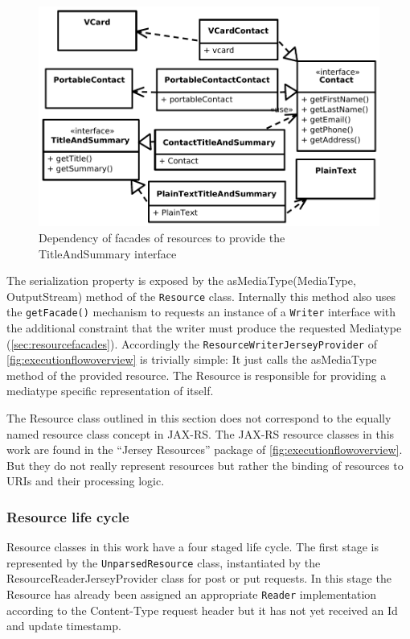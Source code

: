 \documentclass[12pt,a4paper,twoside]{scrartcl}		%
\begin{document}
\begin{figure}[htb]
  \centering
  \includegraphics[width=1\textwidth]{titleandsummary}

  \caption{Dependency of facades of resources to provide the TitleAndSummary interface}
  \label{fig:titleandsummary}
\end{figure}

The serialization property is exposed by the asMediaType(MediaType,
OutputStream) method of the \lstinline:Resource: class. Internally this method
also uses the \lstinline:getFacade(): mechanism to requests an instance of a
\lstinline:Writer: interface with the additional constraint that the writer must
produce the requested Mediatype (\autoref{sec:resourcefacades}). Accordingly the
\lstinline:ResourceWriterJerseyProvider: of \autoref{fig:executionflowoverview}
is trivially simple: It just calls the asMediaType method of the provided
resource. The Resource is responsible for providing a mediatype specific
representation of itself.

The Resource class outlined in this section does not correspond to the equally
named resource class concept in JAX-RS\cite{JAX-RS1.1}. The JAX-RS resource
classes in this work are found in the ``Jersey Resources'' package of
\autoref{fig:executionflowoverview}. But they do not really represent resources
but rather the binding of resources to URIs and their processing logic.

\subsubsection{Resource life cycle}
\label{sec:resource-life-cycle}

Resource classes in this work have a four staged life cycle.  The first stage is
represented by the \lstinline:UnparsedResource: class, instantiated by the
ResourceReaderJerseyProvider class for post or put requests. In this stage the
Resource has already been assigned an appropriate \lstinline:Reader:
implementation according to the Content-Type request header but it has not yet
received an Id and update timestamp.
\end{document}
